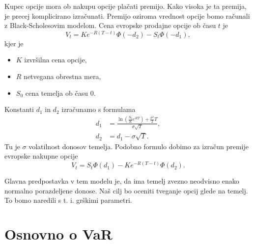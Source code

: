 \documentclass[a4paper, 12pt]{article}
\theoremstyle{definition}
\theoremstyle{plain}
\begin{document}
Kupec opcije mora ob nakupu opcije plačati premijo. Kako visoka je ta premija, je precej komplicirano izračunati.
Premijo oziroma vrednost opcije bomo računali z Black-Scholesovim modelom. Cena evropske prodajne opcije ob času $t$ je 
\begin{equation}\label{prodajna}
    V_t = Ke^{-R(T-t)}\Phi(-d_2)-S_t\Phi(-d_1),
\end{equation}
kjer je
\begin{itemize}
    \item $K$ izvršilna cena opcije,
    \item $R$ netvegana obrestna mera,
    \item $S_0$ cena temelja ob času $0$.
\end{itemize}
Konstanti $d_1$ in $d_2$ izračunamo s formulama
\begin{equation}
    \begin{aligned}
        d_1 &= \frac{\ln(\frac{S_0}{K}e^{RT})+\frac{\sigma^2}{2}T}{\sigma\sqrt{T}},\\
    d_2 &= d_1-\sigma\sqrt{T}. 
    \end{aligned}
\end{equation}
Tu je $\sigma$ volatilnost donosov temelja. Podobno formulo dobimo za izračun premije evropske nakupne opcije
\begin{equation}\label{nakupna}
    V_t = S_t\Phi(d_1) - Ke^{-R(T-t)}\Phi(d_2).
\end{equation}

Glavna predpostavka v tem modelu je, da ima temelj zvezno neodvisno enako normalno porazdeljene donose.
Naš cilj bo oceniti tveganje opcij glede na temelj. To bomo naredili s t. i. grškimi parametri.




\section{Osnovno o VaR}
\end{document}
